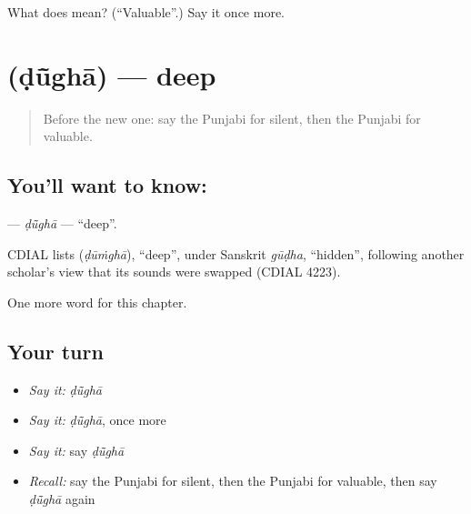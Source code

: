 \begin{tcolorbox}[breakable,colback=teal!4,colframe=teal!35!black,title={Before you move on}]
What does  mean? (\textquotedblleft{}Valuable\textquotedblright{}.) Say it once more.
\end{tcolorbox}
\section[\texorpdfstring{\pa{ਡੂੰਘਾ} (ḍū̃ghā)}{ਡੂੰਘਾ (ḍū̃ghā)}]{ (ḍū̃ghā) — deep}

\label{lesson:PA-C140-dugha}



\begin{quote}
Before the new one: say the Punjabi for silent, then the Punjabi for valuable.
\end{quote}

\subsection*{You'll want to know: }
\textbf{} — \emph{ḍū̃ghā} — \textquotedblleft{}deep\textquotedblright{}.

\begin{cousinweb}
CDIAL lists \textbf{} (\emph{ḍūṁghā}), \textquotedblleft{}deep\textquotedblright{}, under Sanskrit \emph{gūḍha}, \textquotedblleft{}hidden\textquotedblright{}, following another scholar's view that its sounds were swapped (CDIAL 4223).
\end{cousinweb}

\begin{grammarlens}[title={What you've built}]
One more word for this chapter.
\end{grammarlens}

\subsection*{Your turn}
\begin{itemize}
\raggedright
  \item \emph{Say it:} \emph{ḍū̃ghā}
  \item \emph{Say it:} \emph{ḍū̃ghā}, once more
  \item \emph{Say it:} say \emph{ḍū̃ghā}
  \item \emph{Recall:} say the Punjabi for silent, then the Punjabi for valuable, then say \emph{ḍū̃ghā} again
\end{itemize}

